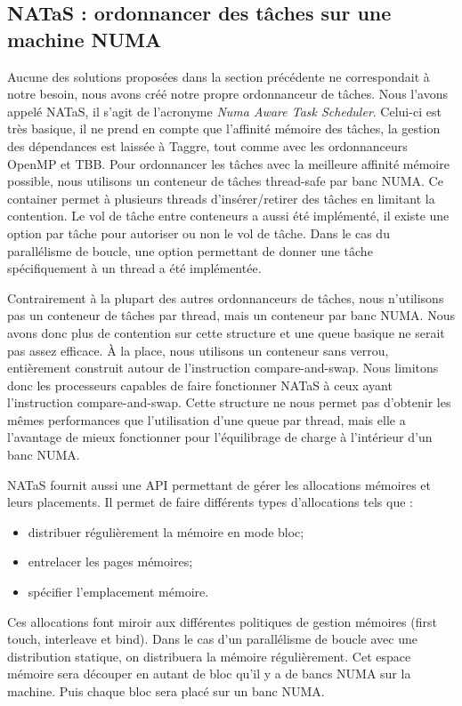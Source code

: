 \subsection{NATaS : ordonnancer des tâches sur une machine NUMA}
Aucune des solutions proposées dans la section précédente ne correspondait à notre besoin, nous avons créé notre propre ordonnanceur de tâches.
%
Nous l'avons appelé NATaS, il s'agit de l'acronyme {\em Numa Aware Task Scheduler}.
%
Celui-ci est très basique, il ne prend en compte que l'affinité mémoire des tâches, la gestion des dépendances est laissée à Taggre, tout comme avec les ordonnanceurs OpenMP et TBB.
%
Pour ordonnancer les tâches avec la meilleure affinité mémoire possible, nous utilisons un conteneur de tâches thread-safe par banc NUMA.
%
Ce container permet à plusieurs threads d'insérer/retirer des tâches en limitant la contention.
%
Le vol de tâche entre conteneurs a aussi été implémenté, il existe une option par tâche pour autoriser ou non le vol de tâche.
%
Dans le cas du parallélisme de boucle, une option permettant de donner une tâche spécifiquement à un thread a été implémentée.

Contrairement à la plupart des autres ordonnanceurs de tâches, nous n'utilisons pas un conteneur de tâches par thread, mais un conteneur par banc NUMA.
%
Nous avons donc plus de contention sur cette structure et une queue basique ne serait pas assez efficace.
%
\`A la place, nous utilisons un conteneur sans verrou, entièrement construit autour de l'instruction compare-and-swap.
%
Nous limitons donc les processeurs capables de faire fonctionner NATaS à ceux ayant l'instruction compare-and-swap.
%
Cette structure ne nous permet pas d'obtenir les mêmes performances que l'utilisation d'une queue par thread, mais elle a l'avantage de mieux fonctionner pour l'équilibrage de charge à l'intérieur d'un banc NUMA.



NATaS fournit aussi une API permettant de gérer les allocations mémoires et leurs placements.
%
Il permet de faire différents types d'allocations tels que :
\begin{itemize}
  \item distribuer régulièrement la mémoire en mode bloc;
  \item entrelacer les pages mémoires;
  \item spécifier l'emplacement mémoire.
\end{itemize}
%
Ces allocations font miroir aux différentes politiques de gestion mémoires (first touch, interleave et bind).
%
Dans le cas d'un parallélisme de boucle avec une distribution statique, on distribuera la mémoire régulièrement.
%
Cet espace mémoire sera découper en autant de bloc qu'il y a de bancs NUMA sur la machine.
%
Puis chaque bloc sera placé sur un banc NUMA.




